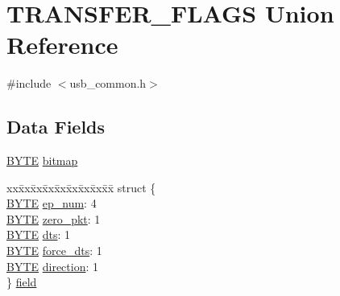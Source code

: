 \hypertarget{union_t_r_a_n_s_f_e_r___f_l_a_g_s}{}\section{T\+R\+A\+N\+S\+F\+E\+R\+\_\+\+F\+L\+A\+G\+S Union Reference}
\label{union_t_r_a_n_s_f_e_r___f_l_a_g_s}


{\ttfamily \#include $<$usb\+\_\+common.\+h$>$}

\subsection*{Data Fields}
\begin{DoxyCompactItemize}
\item 
\hyperlink{_generic_type_defs_8h_a4ae1dab0fb4b072a66584546209e7d58}{B\+Y\+T\+E} \hyperlink{union_t_r_a_n_s_f_e_r___f_l_a_g_s_aeaf0bd08f496808a64c5beb062fb535e}{bitmap}
\item 
\begin{tabbing}
xx\=xx\=xx\=xx\=xx\=xx\=xx\=xx\=xx\=\kill
struct \{\\
\>\hyperlink{_generic_type_defs_8h_a4ae1dab0fb4b072a66584546209e7d58}{BYTE} \hyperlink{union_t_r_a_n_s_f_e_r___f_l_a_g_s_ac9d8e96d71dcb9b2f184a4851efbd04c}{ep\_num}: 4\\
\>\hyperlink{_generic_type_defs_8h_a4ae1dab0fb4b072a66584546209e7d58}{BYTE} \hyperlink{union_t_r_a_n_s_f_e_r___f_l_a_g_s_a9e4e83aa407fb630212de02d83d6057c}{zero\_pkt}: 1\\
\>\hyperlink{_generic_type_defs_8h_a4ae1dab0fb4b072a66584546209e7d58}{BYTE} \hyperlink{union_t_r_a_n_s_f_e_r___f_l_a_g_s_a57d302cdd3476d88108d675f9b3d2adb}{dts}: 1\\
\>\hyperlink{_generic_type_defs_8h_a4ae1dab0fb4b072a66584546209e7d58}{BYTE} \hyperlink{union_t_r_a_n_s_f_e_r___f_l_a_g_s_ab0860f3e9038ea7b16e8213e9db2716f}{force\_dts}: 1\\
\>\hyperlink{_generic_type_defs_8h_a4ae1dab0fb4b072a66584546209e7d58}{BYTE} \hyperlink{union_t_r_a_n_s_f_e_r___f_l_a_g_s_ad5fd6113d5a9e124e75b161c5df3b2b0}{direction}: 1\\
\} \hyperlink{union_t_r_a_n_s_f_e_r___f_l_a_g_s_ad3836a363e09827274f0723135daa94e}{field}\\

\end{tabbing}\end{DoxyCompactItemize}


